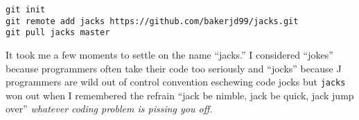 \begin{verbatim}
git init
git remote add jacks https://github.com/bakerjd99/jacks.git
git pull jacks master
\end{verbatim}


It took me a few moments to settle on the name ``jacks.'' I considered
``jokes'' because programmers often take their code too seriously and
``jocks'' because J programmers are wild out of control convention
eschewing code jocks but \texttt{jacks} won out when I remembered the
refrain ``jack be nimble, jack be quick, jack jump over'' \emph{whatever
coding problem is pissing you off.}




%